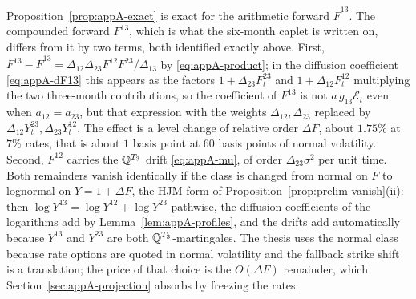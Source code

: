 \documentclass[../../main.tex]{subfiles}
\begin{document}
\begin{remark}\label{rem:appA-remainders}
Proposition~\ref{prop:appA-exact} is exact for the arithmetic forward $\bar F^{13}$. The compounded forward $F^{13}$, which is what the six-month caplet is written on, differs from it by two terms, both identified exactly above. First, $F^{13}-\bar F^{13}=\Delta_{12}\Delta_{23}F^{12}F^{23}/\Delta_{13}$ by \eqref{eq:appA-product}; in the diffusion coefficient \eqref{eq:appA-dF13} this appears as the factors $1+\Delta_{23}F^{23}_t$ and $1+\Delta_{12}F^{12}_t$ multiplying the two three-month contributions, so the coefficient of $F^{13}$ is not $a\,g_{13}\mathcal E_t$ even when $a_{12}=a_{23}$, but that expression with the weights $\Delta_{12},\Delta_{23}$ replaced by $\Delta_{12}Y^{23}_t,\Delta_{23}Y^{12}_t$. The effect is a level change of relative order $\Delta F$, about $1.75\%$ at $7\%$ rates, that is about $1$ basis point at $60$ basis points of normal volatility. Second, $F^{12}$ carries the $\mathbb{Q}^{T_3}$ drift \eqref{eq:appA-mu}, of order $\Delta_{23}\sigma^2$ per unit time. Both remainders vanish identically if the class is changed from normal on $F$ to lognormal on $Y=1+\Delta F$, the HJM form of Proposition~\ref{prop:prelim-vanish}(ii): then $\log Y^{13}=\log Y^{12}+\log Y^{23}$ pathwise, the diffusion coefficients of the logarithms add by Lemma~\ref{lem:appA-profiles}, and the drifts add automatically because $Y^{13}$ and $Y^{23}$ are both $\mathbb{Q}^{T_3}$-martingales. The thesis uses the normal class because rate options are quoted in normal volatility and the fallback strike shift is a translation; the price of that choice is the $O(\Delta F)$ remainder, which Section~\ref{sec:appA-projection} absorbs by freezing the rates.
\end{remark}
\end{document}
